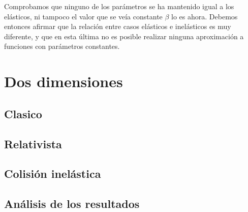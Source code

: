 \documentclass[11pt, spanish]{book}
\begin{document}
\vspace{3mm}

Comprobamos que ninguno de los parámetros se ha mantenido igual a los elásticos, ni tampoco el valor que se veía constante \( \beta \) lo es ahora. Debemos entonces afirmar que la relación entre casos elásticos e inelásticos es muy diferente, y que en esta última no es posible realizar ninguna aproximación a funciones con parámetros constantes. 


\section{Dos dimensiones}

\subsection{Clasico}

\subsection{Relativista}

\subsection{Colisión inelástica}

\subsection{Análisis de los resultados}
\end{document}
